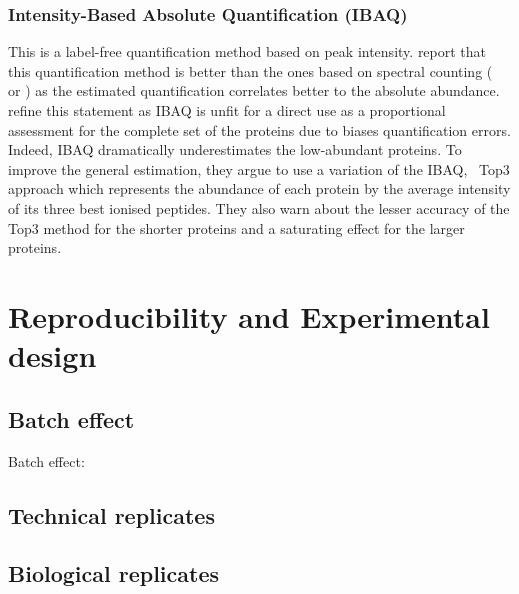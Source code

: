 



\subsubsection{Intensity-Based Absolute Quantification (IBAQ)}
This is a label-free quantification method based on peak intensity.
\cite{Arike2012} report that this quantification method is better than the ones
based on spectral counting (\eg\   or
) as the estimated quantification correlates better to
the absolute abundance.
\cite{TOP3isbetter} refine this statement as \gls{IBAQ} is unfit for a direct
use as a proportional assessment for the complete set of the proteins
due to biases quantification errors.
Indeed, \gls{IBAQ} dramatically underestimates the low-abundant proteins.
To improve the general estimation,
they argue to use a variation of the \gls{IBAQ},~\cite{Silva-Top3} Top3 approach
which represents the abundance of each protein by the average intensity of
its three best ionised peptides.
They also warn about the lesser accuracy of the Top3 method
for the shorter proteins and a saturating effect for the larger proteins.




\section{Reproducibility and Experimental design}\label{sec:expDesign}
    \subsection{Batch effect}\label{sub:BatchEffect}
    Batch effect: 
    \subsection{Technical replicates}
    \subsection{Biological replicates}
